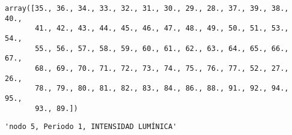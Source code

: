 \documentclass[11pt]{article}
\begin{document}
    
    
    \begin{verbatim}
array([35., 36., 34., 33., 32., 31., 30., 29., 28., 37., 39., 38., 40.,
       41., 42., 43., 44., 45., 46., 47., 48., 49., 50., 51., 53., 54.,
       55., 56., 57., 58., 59., 60., 61., 62., 63., 64., 65., 66., 67.,
       68., 69., 70., 71., 72., 73., 74., 75., 76., 77., 52., 27., 26.,
       78., 79., 80., 81., 82., 83., 84., 86., 88., 91., 92., 94., 95.,
       93., 89.])
    \end{verbatim}

    
    
    \begin{verbatim}
'nodo 5, Periodo 1, INTENSIDAD LUMÍNICA'
    \end{verbatim}

    
    
\end{document}
